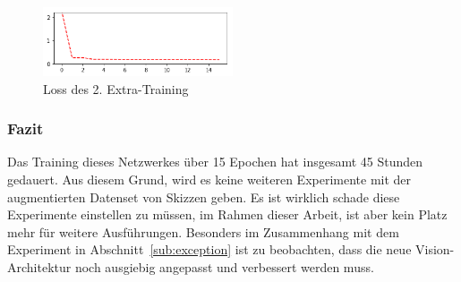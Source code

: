 \documentclass[pdftex,a4paper,halfparskip, article]{scrartcl}
\begin{document}
\begin{figure}[h]
\centering
\includegraphics[width=0.5\textwidth]{loss_drawn_x_15}
\caption{Loss des 2. Extra-Training}
\label{fig:loss_drawn_x_15}
\end{figure}

\subsubsection*{Fazit}
Das Training dieses Netzwerkes über 15 Epochen hat insgesamt 45 Stunden gedauert. Aus diesem Grund, wird es keine weiteren Experimente mit der augmentierten Datenset von Skizzen geben. 
Es ist wirklich schade diese Experimente einstellen zu müssen, im Rahmen dieser Arbeit, ist aber kein Platz mehr für weitere Ausführungen. Besonders im Zusammenhang mit dem Experiment in Abschnitt~\ref{sub:exception} ist zu beobachten, dass die neue Vision-Architektur noch ausgiebig angepasst und verbessert werden muss.
\end{document}

